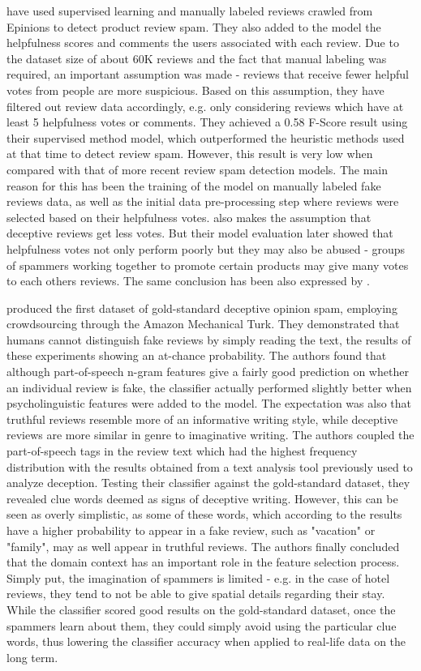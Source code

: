 \citet{Li2011} have used supervised learning and manually labeled reviews crawled from Epinions to detect product review spam. They also added to the model the helpfulness scores and comments the users associated with each review. Due to the dataset size of about 60K reviews and the fact that manual labeling was required, an important assumption was made - reviews that receive fewer helpful votes from people are more suspicious. Based on this assumption, they have filtered out review data accordingly, e.g. only considering reviews which have at least 5 helpfulness votes or comments.
They achieved a 0.58 F-Score result using their supervised method model, which outperformed the heuristic methods used at that time to detect review spam. However, this result is very low when compared with that of more recent review spam detection models. The main reason for this has been the training of the model on manually labeled fake reviews data, as well as the initial data pre-processing step where reviews were selected based on their helpfulness votes. \citet{Mukherjee2013} also makes the  assumption that deceptive reviews get less votes. But their model evaluation later showed that helpfulness votes not only perform poorly but they may also be abused - groups of spammers working together to promote certain products may give many votes to each others reviews. The same conclusion has been also expressed by \citet{Lim2010}.

\citet{Ott2011} produced the first dataset of gold-standard deceptive opinion spam, employing crowdsourcing through the Amazon Mechanical Turk. They demonstrated that humans cannot distinguish fake reviews by simply reading the text, the results of these experiments showing an  at-chance probability. The authors found that although part-of-speech n-gram features give a fairly good prediction on whether an individual review is fake, the classifier actually performed slightly better when psycholinguistic features were added to the model. The expectation was also that truthful reviews resemble more of an informative writing style, while deceptive reviews are more similar in genre to imaginative writing. The authors coupled the part-of-speech tags in the review text which had the highest frequency distribution with the results obtained from a text analysis tool previously used to analyze deception. Testing their classifier against the gold-standard dataset, they revealed clue words deemed as signs of deceptive writing. However, this can be seen as overly simplistic, as some of these words, which according to the results have a higher probability to appear in a fake review, such as "vacation" or "family", may as well appear in truthful reviews. The authors finally concluded that the domain context has an important role in the feature selection process. Simply put, the imagination of spammers is limited - e.g. in the case of hotel reviews, they tend to not be able to give spatial details regarding their stay. While the classifier scored good results on the gold-standard dataset, once the spammers learn about them, they could simply avoid using the particular clue words, thus lowering the classifier accuracy when applied to real-life data on the long term. 

